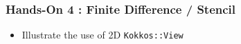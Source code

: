 \begin{frame}[fragile=singleslide]
  \frametitle{Hands-On 4 : Finite Difference / Stencil}

  \hypertarget{handson4}{}

  \begin{itemize}
  \item Illustrate the use of 2D \texttt{Kokkos::View}
  \end{itemize}
  
\end{frame}